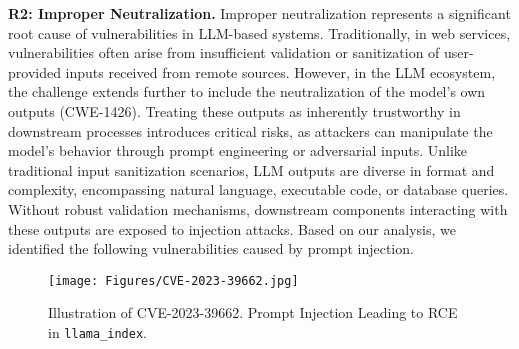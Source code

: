\noindent \textbf{R2: Improper Neutralization.} 
Improper neutralization represents a significant root cause of vulnerabilities in LLM-based systems. Traditionally, in web services, vulnerabilities often arise from insufficient validation or sanitization of user-provided inputs received from remote sources. However, in the LLM ecosystem, the challenge extends further to include the neutralization of the model’s own outputs (CWE-1426). Treating these outputs as inherently trustworthy in downstream processes introduces critical risks, as attackers can manipulate the model’s behavior through prompt engineering or adversarial inputs. Unlike traditional input sanitization scenarios, LLM outputs are diverse in format and complexity, encompassing natural language, executable code, or database queries. Without robust validation mechanisms, downstream components interacting with these outputs are exposed to injection attacks. Based on our analysis, we identified the following vulnerabilities caused by prompt injection.

\begin{figure}[t]
    \centering
    \texttt{[image: Figures/CVE-2023-39662.jpg]}
    \caption{Illustration of CVE-2023-39662. Prompt Injection Leading to RCE in \texttt{llama\_index}.}
    \label{fig:cve-2023-39662}
\end{figure}

